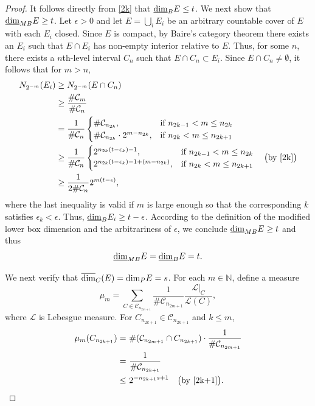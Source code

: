 \documentclass[10pt,a4paper]{amsart}
\newcommand\lbd{\underline{\mbox{\rm dim}}_{\rm B}} %
\newcommand\mlbd{\underline{\mbox{\rm dim}}_{\rm MB}} %
\newcommand\pkd{\mbox{\rm dim}_{\rm P}} %
\newcommand\ucod{\overline{\mbox{\rm dim}}_{\rm C}} %
\begin{document}
\begin{proof}
		It follows directly from \eqref{2k} that $\lbd E\leq t$.
		We next show that $\mlbd E\geq t$.
		Let $\epsilon>0$ and
		let $E=\bigcup_i E_i$ be an arbitrary countable cover of $E$ with each  $E_i$  closed.
		Since $E$ is compact, by Baire's category theorem there  exists an  $E_i$ such that $E \cap E_i$ has non-empty interior relative to $E$.
		Thus, for some $n$, there exists a $n$th-level interval $C_n$ such that $E\cap C_n\subset  E_i$.
		Since $E\cap C_n\neq\emptyset$, it follows that for $m>n$,
		\begin{align*}
			N_{2^{-m}}(E_i)&\geq N_{2^{-m}}(E\cap C_n)\\
			&\geq\frac{\#\mathcal{C}_m}{\#\mathcal{C}_n}\\
			&=\frac{1}{\#\mathcal{C}_n}\begin{cases}
				\#\mathcal{C}_{n_{2k}}, & \text{if } n_{2k-1}<m\leq n_{2k}\\
					\#\mathcal{C}_{n_{2k}}\cdot 2^{m-n_{2k}}, & \text{if } n_{2k}<m\leq n_{2k+1}
			\end{cases}\\
			&\geq\frac{1}{\#\mathcal{C}_n}\begin{cases}
				2^{n_{2k}(t-\epsilon_k)-1}, & \text{if } n_{2k-1}<m\leq n_{2k}\\
				2^{n_{2k}(t-\epsilon_k)-1+(m-n_{2k})}, & \text{if } n_{2k}<m\leq n_{2k+1}
			\end{cases}\quad\big(\text{by } \eqref{2k}\big)\\
			&\geq\frac{1}{2\#\mathcal{C}_n}2^{m(t-\epsilon)},
		\end{align*}
		where the last inequality is valid if $m$ is large enough so that the corresponding $k$ satisfies $\epsilon_k<\epsilon$.
		Thus, $\lbd E_i\geq t-\epsilon$. According to the definition of the modified lower box dimension and the arbitrariness of $\epsilon$, we conclude $\mlbd E\geq t$
		and thus
		\begin{equation*}
			\mlbd E=\lbd E= t.
		\end{equation*}
		
		
		
		We next  verify that  $\ucod (E)= \pkd E = s$. For each $m\in \mathbb{N}$, define a measure 
		\begin{equation*}
			\mu_m= \sum_{C\in\mathcal{C}_{n_{2m+1}}}\frac{1}{\#\mathcal{C}_{n_{2m+1}}}\frac{\mathcal{L}|_C}{\mathcal{L}(C)},
		\end{equation*}
		where $\mathcal{L}$ is Lebesgue measure.
		For  $C_{n_{2k+1}}\in\mathcal{C}_{n_{2k+1}}$ and $k\leq m$, 
			\begin{align}\label{mumc}
			\mu_m(C_{n_{2k+1}})
			=&\ \#(\mathcal{C}_{n_{2m+1}}\cap C_{n_{2k+1}})\cdot\frac{1}{\#\mathcal{C}_{n_{2m+1}}}\notag\\
			=&\ \frac{1}{\#\mathcal{C}_{n_{2k+1}}}\notag\\
			\leq&\ 2^{-n_{2k+1}s+1}\quad\big(\text{by } \eqref{2k+1}\big).
		\end{align}	
		

\end{proof}
\end{document}

